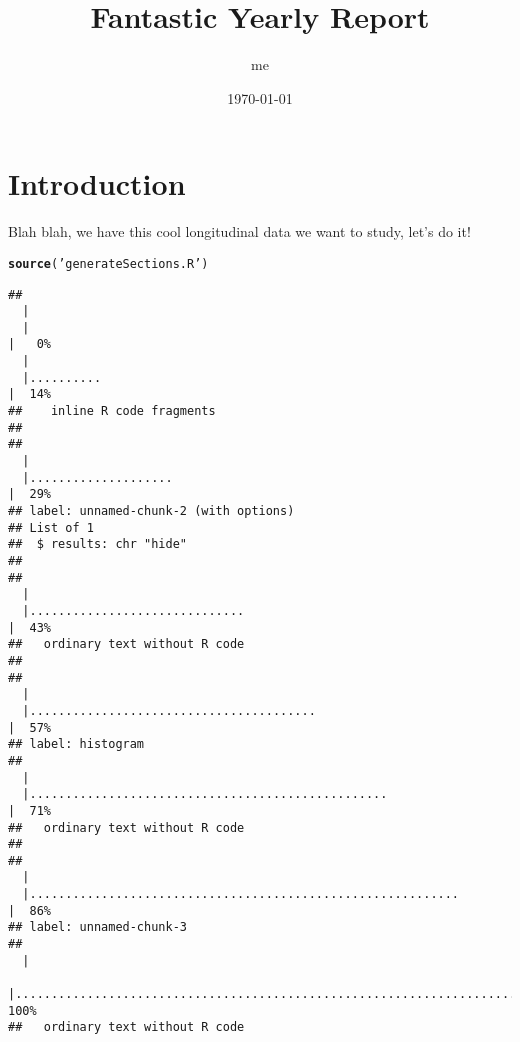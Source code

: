 \documentclass{article}\usepackage[]{graphicx}\usepackage[]{color}
\title{Fantastic Yearly Report}
\author{me}
\date{\today}
\makeatletter
\newcommand{\hlstr}[1]{\textcolor[rgb]{0.192,0.494,0.8}{#1}}%
\newcommand{\hlstd}[1]{\textcolor[rgb]{0.345,0.345,0.345}{#1}}%
\newcommand{\hlkwd}[1]{\textcolor[rgb]{0.737,0.353,0.396}{\textbf{#1}}}%
\newenvironment{kframe}{%
 \def\at@end@of@kframe{}%
 \ifinner\ifhmode%
  \def\at@end@of@kframe{\end{minipage}}%
  \begin{minipage}{\columnwidth}%
 \fi\fi%
 \def\FrameCommand##1{\hskip\@totalleftmargin \hskip-\fboxsep
 \colorbox{shadecolor}{##1}\hskip-\fboxsep
     \hskip-\linewidth \hskip-\@totalleftmargin \hskip\columnwidth}%
 \MakeFramed {\advance\hsize-\width
   \@totalleftmargin\z@ \linewidth\hsize
   \@setminipage}}%
 {\par\unskip\endMakeFramed%
 \at@end@of@kframe}
\newenvironment{knitrout}{}{} %
\makeatother
\begin{document}
\section{Introduction}
Blah blah, we have this cool longitudinal data we want to study, let's do it! 

\begin{knitrout}
\color{fgcolor}\begin{kframe}
\begin{alltt}
\hlkwd{source}\hlstd{(}\hlstr{'generateSections.R'}\hlstd{)}
\end{alltt}


{\ttfamily\noindent\itshape\color{messagecolor}{\#\# \\\#\# \\\#\# processing file: templateSection.Rnw}}\begin{verbatim}
## 
  |                                                                            
  |                                                                      |   0%
  |                                                                            
  |..........                                                            |  14%
##    inline R code fragments
## 
## 
  |                                                                            
  |....................                                                  |  29%
## label: unnamed-chunk-2 (with options) 
## List of 1
##  $ results: chr "hide"
## 
## 
  |                                                                            
  |..............................                                        |  43%
##   ordinary text without R code
## 
## 
  |                                                                            
  |........................................                              |  57%
## label: histogram
## 
  |                                                                            
  |..................................................                    |  71%
##   ordinary text without R code
## 
## 
  |                                                                            
  |............................................................          |  86%
## label: unnamed-chunk-3
## 
  |                                                                            
  |......................................................................| 100%
##   ordinary text without R code
\end{verbatim}


{\ttfamily\noindent\itshape\color{messagecolor}{\#\# output file: year1.tex\\\#\# \\\#\# \\\#\# \\\#\# processing file: templateSection.Rnw}}

{\ttfamily\noindent\bfseries\color{errorcolor}{\#\# Error in parse\_block(g[-1], g[1], params.src): duplicate label 'unnamed-chunk-1'}}\end{kframe}
\end{knitrout}






\end{document}

